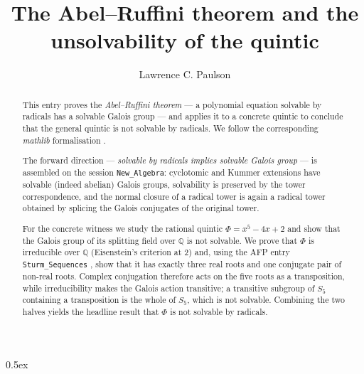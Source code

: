 \documentclass{article}
\begin{document}
\title{The Abel--Ruffini theorem and the unsolvability of the quintic}
\author{Lawrence C. Paulson}
\date{}

\maketitle

\begin{abstract}
  This entry proves the \emph{Abel--Ruffini theorem} --- a polynomial equation
  solvable by radicals has a solvable Galois group --- and applies it to a
  concrete quintic to conclude that the general quintic is not solvable by
  radicals.  We follow the corresponding \emph{mathlib} formalisation
  \cite{mathlib-abel-ruffini}.

  The forward direction --- \emph{solvable by radicals implies solvable Galois
  group} --- is assembled on the session
  \texttt{New\_Algebra}: cyclotomic and Kummer extensions have solvable (indeed
  abelian) Galois groups, solvability is preserved by the tower correspondence,
  and the normal closure of a radical tower is again a radical tower obtained by
  splicing the Galois conjugates of the original tower.

  For the concrete witness we study the rational quintic $\Phi = x^5 - 4x + 2$
  and show that the Galois group of its splitting field over $\mathbb{Q}$ is
  not solvable.  We prove that $\Phi$ is irreducible over $\mathbb{Q}$
  (Eisenstein's criterion at $2$) and, using the AFP
  entry \texttt{Sturm\_Sequences} \cite{eberl-sturm}, show that it has exactly three
  real roots and one conjugate pair of non-real roots. Complex conjugation
  therefore acts on the five roots as a transposition, while irreducibility
  makes the Galois action transitive; a transitive subgroup of $S_5$ containing
  a transposition is the whole of $S_5$, which is not solvable.  Combining the
  two halves yields the headline result that $\Phi$ is not solvable by radicals.
\end{abstract}

\parindent 0pt\parskip 0.5ex

\pagestyle{plain}

\tableofcontents
\newpage





\end{document}
